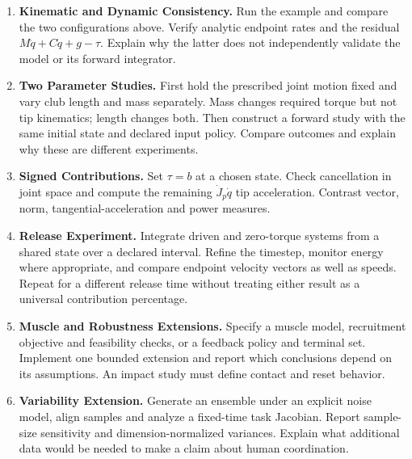\begin{enumerate}
 \item \textbf{Kinematic and Dynamic Consistency.} Run the example and compare
 the two configurations above. Verify analytic endpoint rates and the residual
 $M\ddot q+C\dot q+g-\tau$. Explain why the latter does not independently
 validate the model or its forward integrator.
 \item \textbf{Two Parameter Studies.} First hold the prescribed joint motion
 fixed and vary club length and mass separately. Mass changes required torque
 but not tip kinematics; length changes both. Then construct a forward study
 with the same initial state and declared input policy. Compare outcomes and
 explain why these are different experiments.
 \item \textbf{Signed Contributions.} Set $\tau=b$ at a chosen state. Check
 cancellation in joint space and compute the remaining $\dot J_p\dot q$ tip
 acceleration. Contrast vector, norm, tangential-acceleration and power measures.
 \item \textbf{Release Experiment.} Integrate driven and zero-torque systems
 from a shared state over a declared interval. Refine the timestep, monitor
 energy where appropriate, and compare endpoint velocity vectors as well as
 speeds. Repeat for a different release time without treating either result as
 a universal contribution percentage.
 \item \textbf{Muscle and Robustness Extensions.} Specify a muscle model,
 recruitment objective and feasibility checks, or a feedback policy and terminal
 set. Implement one bounded extension and report which conclusions depend on
 its assumptions. An impact study must define contact and reset behavior.
 \item \textbf{Variability Extension.} Generate an ensemble under an explicit
 noise model, align samples and analyze a fixed-time task Jacobian. Report
 sample-size sensitivity and dimension-normalized variances. Explain what
 additional data would be needed to make a claim about human coordination.
\end{enumerate}
